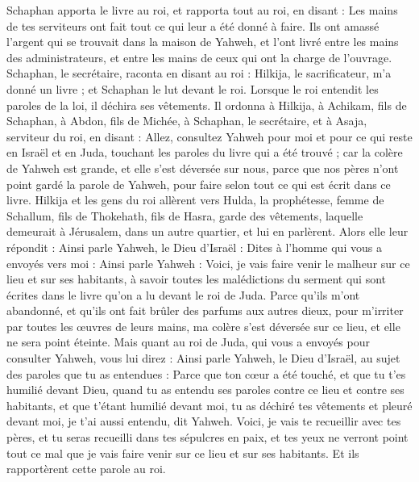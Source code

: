 \begin{multicols}{2}
Schaphan apporta le livre au roi, et rapporta tout au roi, en disant : Les mains de tes serviteurs ont fait tout ce qui leur a été donné à faire.
Ils ont amassé l'argent qui se trouvait dans la maison de Yahweh, et l'ont livré entre les mains des administrateurs, et entre les mains de ceux qui ont la charge de l'ouvrage.
Schaphan, le secrétaire, raconta en disant au roi : Hilkija, le sacrificateur, m'a donné un livre ; et Schaphan le lut devant le roi.
Lorsque le roi entendit les paroles de la loi, il déchira ses vêtements.
Il ordonna à Hilkija, à Achikam, fils de Schaphan, à Abdon, fils de Michée, à Schaphan, le secrétaire, et à Asaja, serviteur du roi, en disant :
Allez, consultez Yahweh pour moi et pour ce qui reste en Israël et en Juda, touchant les paroles du livre qui a été trouvé ; car la colère de Yahweh est grande, et elle s’est déversée sur nous, parce que nos pères n'ont point gardé la parole de Yahweh, pour faire selon tout ce qui est écrit dans ce livre.
Hilkija et les gens du roi allèrent vers Hulda, la prophétesse, femme de Schallum, fils de Thokehath, fils de Hasra, garde des vêtements, laquelle demeurait à Jérusalem, dans un autre quartier, et lui en parlèrent.
Alors elle leur répondit : Ainsi parle Yahweh, le Dieu d'Israël : Dites à l'homme qui vous a envoyés vers moi :
Ainsi parle Yahweh : Voici, je vais faire venir le malheur sur ce lieu et sur ses habitants, à  savoir toutes les malédictions du serment qui sont écrites dans le livre qu'on a lu devant le roi de Juda.
Parce qu'ils m'ont abandonné, et qu'ils ont fait brûler des parfums aux autres dieux, pour m'irriter par toutes les œuvres de leurs mains, ma colère s'est déversée sur ce lieu, et elle ne sera point éteinte.
Mais quant au roi de Juda, qui vous a envoyés pour consulter Yahweh, vous lui direz : Ainsi parle Yahweh, le Dieu d'Israël, au sujet des paroles que tu as entendues :
Parce que ton cœur a été touché, et que tu t'es humilié devant Dieu, quand tu as entendu ses paroles contre ce lieu et contre ses habitants, et que t'étant humilié devant moi, tu as déchiré tes vêtements et pleuré devant moi, je t'ai aussi entendu, dit Yahweh.
Voici, je vais te recueillir avec tes pères, et tu seras recueilli dans tes sépulcres en paix, et tes yeux ne verront point tout ce mal que je vais faire venir sur ce lieu et sur ses habitants. Et ils rapportèrent cette parole au roi.

\end{multicols}
